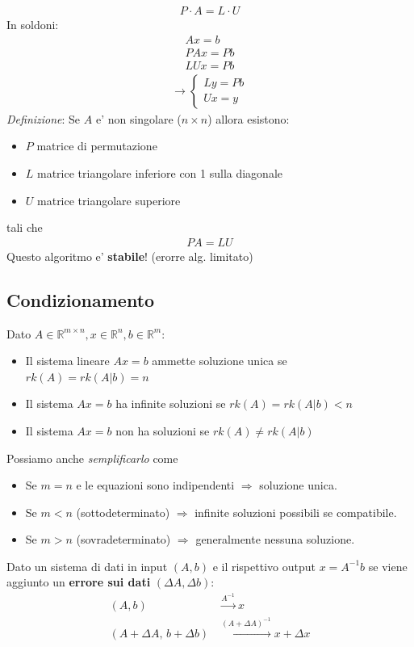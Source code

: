 \documentclass[a4paper,12pt]{article}
\begin{document}
\begin{align*}
    P \cdot A = L \cdot U
\end{align*}
In soldoni:
\begin{align*}
    Ax=b \\
    PAx=Pb \\
    LUx = Pb 
\end{align*}
\begin{align*}
    \rightarrow \boxed{\begin{cases}
        Ly = P b \\
        Ux = y
    \end{cases}}
\end{align*}
\textit{Definizione}: Se $A$ e' non singolare ($n\times n$) allora esistono:
\begin{itemize}
    \item $P$ matrice di permutazione
    \item $L$ matrice triangolare inferiore con 1 sulla diagonale 
    \item $U$ matrice triangolare superiore
\end{itemize}
tali che 
\begin{align*}
    PA = LU
\end{align*}
Questo algoritmo e' \textbf{stabile}! (erorre alg. limitato)
\vspace{2em}\\
\subsection{Condizionamento}
\begin{tcolorbox}[colback=orange!5!white, colframe=orange!75!black, title = Teorema Rouchè Capelli]
Dato $A \in \mathbb{R}^{m \times n}, x \in \mathbb{R}^n, b \in \mathbb{R}^m$:\\
\begin{itemize}
    \item Il sistema lineare $Ax=b$ ammette soluzione unica se $rk(A)=rk(A | b)=n$
    \item Il sistema $Ax=b$ ha infinite soluzioni se $rk(A) = rk(A|b) < n$
    \item Il sistema $Ax=b$ non ha soluzioni se $rk(A) \neq rk(A|b)$
\end{itemize}
Possiamo anche \textit{semplificarlo} come 
\begin{itemize}
    \item Se $m = n$ e le equazioni sono indipendenti $\Rightarrow$ soluzione unica.
    \item Se $m < n$ (sottodeterminato) $\Rightarrow$ infinite soluzioni possibili se compatibile.
    \item Se $m > n$ (sovradeterminato) $\Rightarrow$ generalmente nessuna soluzione.
\end{itemize}
\end{tcolorbox}
Dato un sistema di dati in input $(A,b)$ e il rispettivo output $x=A^{-1}b$ se viene aggiunto un \textbf{errore sui dati} $(\Delta A, \Delta b)$:
\begin{align*}
(A,b) &\xrightarrow{A^{-1}} x \\
(A+\Delta A,\,b+\Delta b) &\xrightarrow{(A+\Delta A)^{-1}} x + \Delta x
\end{align*}
\end{document}
